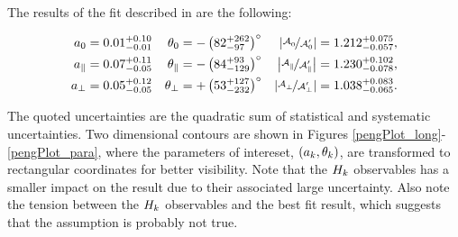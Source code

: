 The results of the \chisq fit described in  are the following:

\begin{subequations}
\label{peng_a_theta_results}
\begin{align}
    a_{0}         & = 0.01^{+0.10}_{-0.01} & \theta_{0}         & = -\left( 82^{+262}_{-97} \right)^\circ &  \left| \nicefrac{\mathcal{A}_{0}^{} }{\mathcal{A}_{0}^{\prime}} \right|          = 1.212^{+0.075}_{-0.057},\\
    a_{\parallel} & = 0.07^{+0.11}_{-0.05} & \theta_{\parallel} & = -\left( 84^{+93}_{-129} \right)^\circ  &  \left| \nicefrac{\mathcal{A}_{\parallel}^{} }{\mathcal{A}_{\parallel}^{\prime}} \right|  = 1.230^{+0.102}_{-0.078},\\
    a_{\perp}     & = 0.05^{+0.12}_{-0.05} & \theta_{\perp}     & = +\left( 53^{+127}_{-232} \right)^\circ &  \left| \nicefrac{\mathcal{A}_{\perp}^{} }{\mathcal{A}_{\perp}^{\prime}} \right|      = 1.038^{+0.083}_{-0.065}.
\end{align}
\end{subequations}

\noindent The quoted uncertainties are the quadratic sum of statistical and systematic uncertainties.
Two dimensional contours are shown in Figures \ref{pengPlot_long}-\ref{pengPlot_para}, where the 
parameters of intereset, $(a_k,\theta_k)$, are transformed to rectangular coordinates for better 
visibility. Note that the $H_{k}$ observables has a smaller impact on the result due to their associated 
large uncertainty. Also note the tension between the $H_{k}$ observables and the best fit result, 
which suggests that the assumption  is probably not true.

